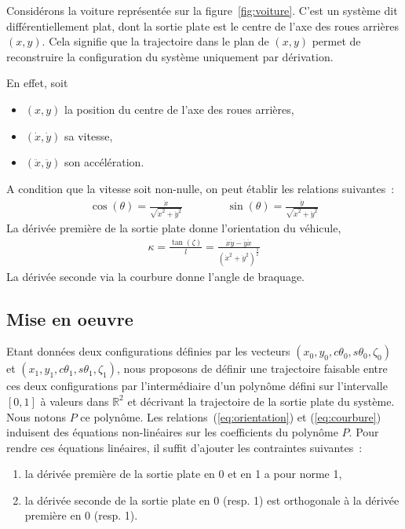 \documentclass {article}
\newcommand\dx{\dot{x}}
\newcommand\dy{\dot{y}}
\newcommand\ddx{\ddot{x}}
\newcommand\ddy{\ddot{y}}
\def\real{{\mathbb R}}
\begin{document}
Considérons la voiture représentée sur la figure~\ref{fig:voiture}. C'est un système dit différentiellement plat, dont la sortie plate est le centre de l'axe des roues arrières $(x,y)$. Cela signifie que la trajectoire dans le plan de $(x,y)$ permet de reconstruire la configuration du système uniquement par dérivation.

En effet, soit
\begin {itemize}
  \item $(x,y)$ la position du centre de l'axe des roues arrières,
  \item $(\dx, \dy)$ sa vitesse,
  \item $(\ddx, \ddy)$ son accélération.
\end {itemize}
A condition que la vitesse soit non-nulle, on peut établir les relations suivantes~:
\begin {align}\label{eq:orientation}
  \cos(\theta) = \frac{\dx}{\sqrt{\dx^2+\dy^2}} & \hspace {1cm} & \sin(\theta) = \frac{\dy}{\sqrt{\dx^2+\dy^2}}
\end {align}
La dérivée première de la sortie plate donne l'orientation du véhicule,
\begin{align}\label{eq:courbure}
  \kappa = \frac{\tan (\zeta)}{l} = \frac{\dx\ddy - \dy\ddx}{(\dx^2+\dy^2)^{\frac{3}{2}}}
\end{align}
La dérivée seconde via la courbure donne l'angle de braquage.

\subsection* {Mise en oeuvre}

Etant données deux configurations définies par les vecteurs $(x_0,y_0,c\theta_0,s\theta_0,\zeta_0)$ et $(x_1,y_1,c\theta_1,s\theta_1,\zeta_1)$, nous proposons de définir une trajectoire faisable entre ces deux configurations par l'intermédiaire d'un polyn\^ome défini sur l'intervalle $[0,1]$ à valeurs dans $\real^2$ et décrivant la trajectoire de la sortie plate du système. Nous notons $P$ ce polyn\^ome. Les relations~(\ref{eq:orientation}) et (\ref{eq:courbure}) induisent des équations non-linéaires sur les coefficients du polyn\^ome $P$. Pour rendre ces équations linéaires, il suffit d'ajouter les contraintes suivantes~:
\begin{enumerate}
\item la dérivée première de la sortie plate en 0 et en 1 a pour norme 1,
\item la dérivée seconde de la sortie plate en 0 (resp. 1) est orthogonale à la dérivée première en 0 (resp. 1).
\end{enumerate}
\end{document}
